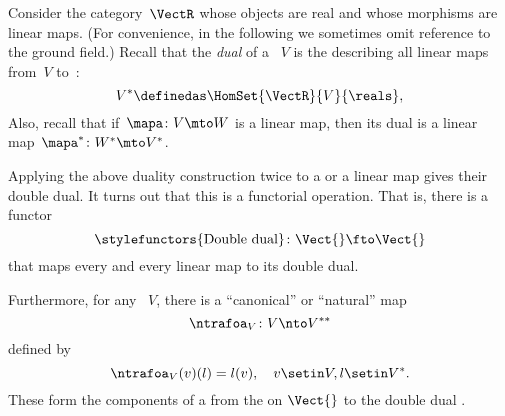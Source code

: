 \begin{example}
    \label{ex:Vect}
    Consider the category~$\VectR$ whose objects are real  and whose morphisms are linear maps.
    (For convenience, in the following we sometimes omit reference to the ground field.)
    Recall that the \emph{dual} of a ~$V$ is the  describing all linear maps from~$V$ to~\reals:
    \begin{equation}
        \label{eq:dual-vector-space}
        V^* \definedas \HomSet{\VectR}{V}{\reals},
    \end{equation}
    Also, recall that if~$\mapa\colon V \mto W$ is a linear map, then its dual is a linear map~$\mapa^* \linebreak[1]  \colon W^* \mto V^*$.

    Applying the above duality construction twice to a  or a linear map gives their double dual.
    It turns out that this is a functorial operation.
    That is, there is a functor
    \begin{equation}
        \label{eq:double-dual-functor}
        \text{\stylefunctors{Double dual}}\colon \Vect{} \fto \Vect{}
    \end{equation}
    that maps every  and every linear map to its double dual.

    Furthermore, for any ~$V$, there is a ``canonical'' or ``natural'' map
    \begin{equation}
        \ntrafoa_V \colon V \nto V^{**}
    \end{equation}
    defined by
    \begin{equation}
        \label{eq:natural-trafo-to-double-dual}
        \ntrafoa_V(v)(l) = l(v), \quad  v \setin V, l \setin V^*.
    \end{equation}
    These form the components of a  from the  on $\Vect{}$ to the double dual .

\end{example}

